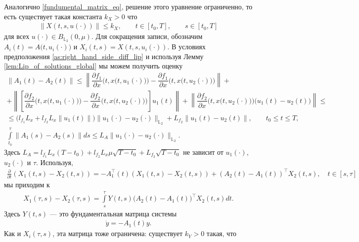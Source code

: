 \documentclass[../main.tex]{subfiles}
\begin{document}
		Аналогично \eqref{fundumental_matrix_eq}, решение этого уравнение ограниченно, то есть существует такая константа $k_X>0$ что
		\begin{gather*}
			\| X(t,s, u(\cdot)) \| \leqslant k_X, \qquad t \in [t_0,T], \qquad s \in [t_0,T]
		\end{gather*}
		для всех $u(\cdot) \in B_{\mathbb{L}_2}(0,\mu)$. 
		Для сокращения записи, обозначим $A_i(t) = A\big(t, u_i(\cdot)\big) $ и $ X_i(t,s) = X(t, s, u_i(\cdot))$. 
		В условиях предположения \ref{as:right_hand_side_diff_lip} и используя Лемму \ref{lem:Lip_of_solutions_global} мы можем получить оценку
		\begin{gather*}
			\| A_1(t) - A_2(t) \| \leqslant 
			\left\| \dfrac{\partial f_1}{\partial x} \Big(t,x\big(t,u_1(\cdot)\big)\Big) - \dfrac{\partial f_1}{\partial x} \Big(t,x\big(t,u_2(\cdot)\big)\Big) \right\| + \\ +
			\left\| \left[ \dfrac{\partial f_2}{\partial x}\Big(t,x\big(t,u_1(\cdot)\big)\Big)  - \dfrac{\partial f_2}{\partial x}\Big(t,x\big(t,u_2(\cdot)\big)\Big) \right] u_1(t) \right\| + 
			\left\| \dfrac{\partial f_2}{\partial x}\Big(t,x\big(t,u_2(\cdot)\big)\Big) \Big(u_1(t) - u_2(t)\Big) \right\| \leqslant \\ \leqslant
			\Big(l_{f_1} L_x  + l_{f_2} L_x \|u_1(t) \|\Big) \| u_1(\cdot) - u_2(\cdot) \|_{\mathbb{L}_2} +  L_{f_2} \| u_1(t) - u_2(t) \|, \qquad t_0 \leqslant t \leqslant T,\\
			\int\limits_{t_0}^{\tau} \|A_1(s) - A_2(s) \| ds \leqslant L_A \| u_1(\cdot) - u_2(\cdot) \|_{\mathbb{L}_2}. 
		\end{gather*}
		Здесь $L_A = l_{f_1} L_x (T - t_0) + l_{f_2} L_x \mu \sqrt{T - t_0} + L_{f_2} \sqrt{T - t_0}$ не зависит от $u_1(\cdot)$, $u_2(\cdot)$ и $\tau$. Используя,
		\begin{gather*}
			\frac{\partial}{\partial t} \left(X_1(t,s) - X_2(t,s) \right) = -A_1^{\top}(t) \left(X_1(t,s) - X_2(t,s) \right) + (A_2(t) - A_1(t))^{\top} X_2(t,s), \quad t \in [s,\tau]
		\end{gather*}
		мы приходим к
		\begin{gather*}
			X_1(\tau,s) - X_2(\tau,s) = \int\limits_s^{\tau} Y(t,s) \big(A_2(t) - A_1(t)\big)^{\top} X_2(t,s) dt.
		\end{gather*}
		Здесь $Y(t,s)$ --- это фундаментальная матрица системы 
		\begin{gather*}
			\dot{y} = -A_1(t) y.
		\end{gather*}
		Как и $X_i(\tau,s)$, эта матрица тоже ограничена: существует $k_Y>0$ такая, что
\end{document}
